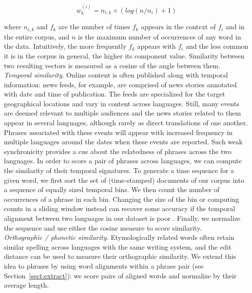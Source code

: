 \documentclass[11pt]{article}
\newcommand{\mnote}[1]{\marginpar{%
  \vskip-\baselineskip
  \raggedright\footnotesize
  \itshape\hrule\smallskip\tiny{#1}\par\smallskip\hrule}}
\newcommand{\mtodo}[1]{\mnote{\textcolor{red}{#1}}}
\newcommand{\secref}[1]{Section~\ref{#1}}
\begin{document}
\begin{equation*}
w_{k}^{(i)} = n_{i,k} \times (log( {n / n_{i}}) + 1)
\end{equation*}

\noindent where $n_{i,k}$ and $f_{k}$ are the number of times $f_{k}$ appears in the context of $f_{i}$ and in the entire corpus, and $n$ is the maximum number of occurrences of any word in the data.  Intuitively, the more frequently $f_{k}$ appears with $f_{i}$ and the less common it is in the corpus in general, the higher its component value.  Similarity between two resulting vectors is measured as a cosine of the angle between them.\\

\noindent\emph{Temporal similarity}. Online content is often published along with temporal information: news feeds, for example, are comprised of news stories annotated with date and time of publication.  The feeds are specialized for the target geographical locations and vary in content across languages.  Still, many events are deemed relevant to multiple audiences and the news stories related to them appear in several languages, although rarely as direct translations of one another.  Phrases associated with these events will appear with increased frequency in multiple languages around the dates when these events are reported.  Such weak synchronicity provides a cue about the relatedness of phrases across the two languages.  In order to score a pair of phrases across languages, we can compute the similarity of their temporal signatures. To generate a time sequence for a given word, we first sort the set of (time-stamped) documents of our corpus into a sequence of equally sized temporal bins.  We then count the number of occurrences of a phrase in each bin.  Changing the size of the bin or computing counts in a sliding window instead can recover some accuracy if the temporal alignment between two languages in our dataset is poor \cite{Klementiev:2006b}.  Finally, we normalize the sequence and use either the cosine measure to score similarity. \\

\noindent\emph{Orthographic / phonetic similarity.} Etymologically related words often retain similar spelling across languages with the same writing system, and the edit distance can be used to measure their orthographic similarity.  We extend this idea to phrases by using word alignments within a phrase pair (see \secref{sect:extract}): we score pairs of aligned words and normalize by their average length. \mtodo{Make sure it is correct.}
\end{document}
